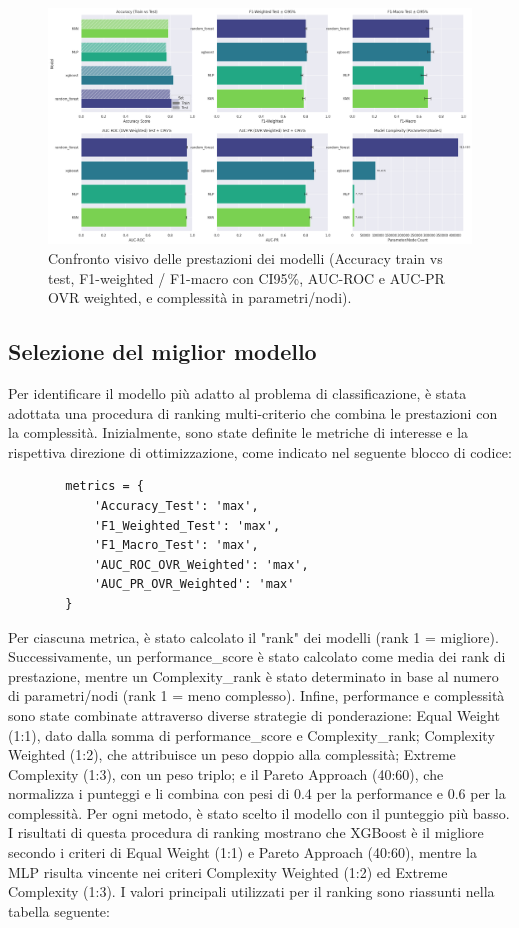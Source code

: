 \documentclass[a4paper,12pt]{report}
\begin{document}
	\begin{figure}[H]
		\centering
		\includegraphics[width=1.0\textwidth]{img/comparison_pm.png}
		\caption{Confronto visivo delle prestazioni dei modelli (Accuracy train vs test, F1-weighted / F1-macro con CI95\%, AUC-ROC e AUC-PR OVR weighted, e complessità in parametri/nodi).}
		\label{fig:comparison_pm}
	\end{figure}
	
	\subsection{Selezione del miglior modello}
	Per identificare il modello più adatto al problema di classificazione, è stata adottata una procedura di ranking multi-criterio che combina le prestazioni con la complessità. Inizialmente, sono state definite le metriche di interesse e la rispettiva direzione di ottimizzazione, come indicato nel seguente blocco di codice:
	
	\begin{verbatim}
		metrics = {
			'Accuracy_Test': 'max',
			'F1_Weighted_Test': 'max',
			'F1_Macro_Test': 'max',
			'AUC_ROC_OVR_Weighted': 'max',
			'AUC_PR_OVR_Weighted': 'max'
		}
	\end{verbatim}
	
	Per ciascuna metrica, è stato calcolato il "rank" dei modelli (rank 1 = migliore). Successivamente, un performance\_score è stato calcolato come media dei rank di prestazione, mentre un Complexity\_rank è stato determinato in base al numero di parametri/nodi (rank 1 = meno complesso). Infine, performance e complessità sono state combinate attraverso diverse strategie di ponderazione: Equal Weight (1:1), dato dalla somma di performance\_score e Complexity\_rank; Complexity Weighted (1:2), che attribuisce un peso doppio alla complessità; Extreme Complexity (1:3), con un peso triplo; e il Pareto Approach (40:60), che normalizza i punteggi e li combina con pesi di 0.4 per la performance e 0.6 per la complessità. Per ogni metodo, è stato scelto il modello con il punteggio più basso. \\
	I risultati di questa procedura di ranking mostrano che XGBoost è il migliore secondo i criteri di Equal Weight (1:1) e Pareto Approach (40:60), mentre la MLP risulta vincente nei criteri Complexity Weighted (1:2) ed Extreme Complexity (1:3). I valori principali utilizzati per il ranking sono riassunti nella tabella seguente:
	
\end{document}
